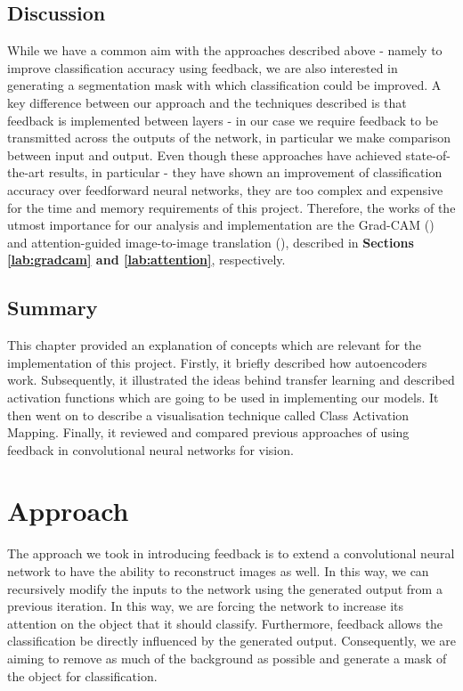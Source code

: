 \documentclass{l4proj}
\begin{document}
\section{Discussion}
While we have a common aim with the approaches described above - namely to improve classification accuracy using feedback, we are also interested in generating a segmentation mask with which classification could be improved. A key difference between our approach and the techniques described is that feedback is implemented between layers - in our case we require feedback to be transmitted across the outputs of the network, in particular we make comparison between input and output. Even though these approaches have achieved state-of-the-art results, in particular - they have shown an improvement of classification accuracy over feedforward neural networks, they are too complex and expensive for the time and memory requirements of this project. Therefore, the works of the utmost importance for our analysis and implementation are the Grad-CAM  (\cite{gradcam}) and  attention-guided image-to-image translation (\cite{imagetransl}), described in \textbf{Sections \ref{lab:gradcam} and \ref{lab:attention}}, respectively.

\section{Summary}
This chapter provided an explanation of concepts which are relevant for the implementation of this project. Firstly, it briefly described how autoencoders work. Subsequently, it illustrated the ideas behind transfer learning and described activation functions which are going to be used in implementing our models. It then went on to describe a visualisation technique called Class Activation Mapping. Finally, it reviewed and compared previous approaches of using feedback in convolutional neural networks for vision.

\chapter{Approach}
\label{chap:approach}
The approach we took in introducing feedback is to extend a convolutional neural network to have the ability to reconstruct images as well. In this way, we can recursively modify the inputs to the network using the generated output from a previous iteration. In this way, we are forcing the network to increase its attention on the object that it should classify. Furthermore, feedback allows the classification be directly influenced by the generated output.
Consequently, we are aiming to remove as much of the background as possible and generate a mask of the object for classification.
\end{document}
